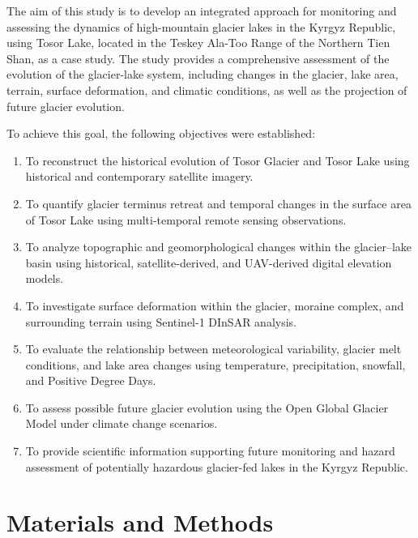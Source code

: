 \documentclass[12pt,a4paper]{report}
\begin{document}
The aim of this study is to develop an integrated approach for monitoring and assessing the dynamics of high-mountain glacier lakes in the Kyrgyz Republic, using Tosor Lake, located in the Teskey Ala-Too Range of the Northern Tien Shan, as a case study. The study provides a comprehensive assessment of the evolution of the glacier-lake system, including changes in the glacier, lake area, terrain, surface deformation, and climatic conditions, as well as the projection of future glacier evolution.


To achieve this goal, the following objectives were established:

\begin{enumerate}
    \item To reconstruct the historical evolution of Tosor Glacier and Tosor Lake using historical and contemporary satellite imagery.

    \item To quantify glacier terminus retreat and temporal changes in the surface area of Tosor Lake using multi-temporal remote sensing observations.

    \item To analyze topographic and geomorphological changes within the glacier--lake basin using historical, satellite-derived, and UAV-derived digital elevation models.

    \item To investigate surface deformation within the glacier, moraine complex, and surrounding terrain using Sentinel-1 DInSAR analysis.

    \item To evaluate the relationship between meteorological variability, glacier melt conditions, and lake area changes using temperature, precipitation, snowfall, and Positive Degree Days.

    \item To assess possible future glacier evolution using the Open Global Glacier Model under climate change scenarios.

    \item To provide scientific information supporting future monitoring and hazard assessment of potentially hazardous glacier-fed lakes in the Kyrgyz Republic.
\end{enumerate}

\chapter{Materials and Methods}
\end{document}
